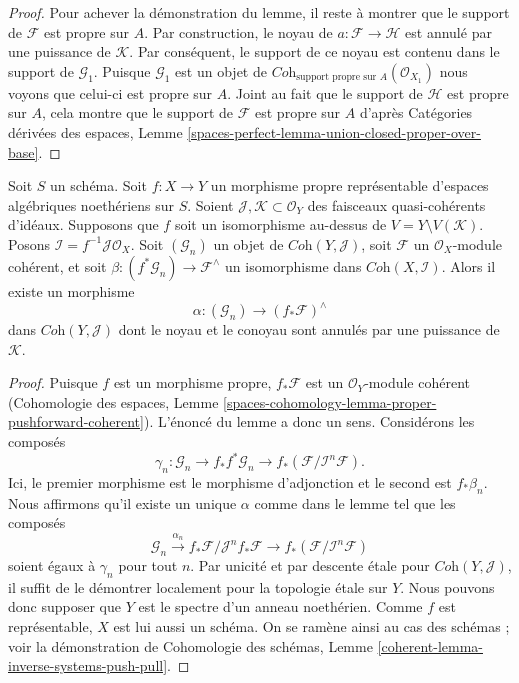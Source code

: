 \begin{proof}
\medskip\noindent
Pour achever la démonstration du lemme, il reste à montrer que le
support de $\mathcal{F}$ est propre sur $A$.
Par construction, le noyau de $a : \mathcal{F} \to \mathcal{H}$
est annulé par une puissance de $\mathcal{K}$. Par conséquent, le support de
ce noyau est contenu dans le support de $\mathcal{G}_1$. Puisque
$\mathcal{G}_1$ est un objet de
$\textit{Coh}_{\text{support propre sur } A}(\mathcal{O}_{X_1})$
nous voyons que celui-ci est propre sur $A$. Joint au fait que le
support de $\mathcal{H}$ est propre sur $A$, cela montre que le
support de $\mathcal{F}$ est propre sur $A$ d'après
Catégories dérivées des espaces, Lemme
\ref{spaces-perfect-lemma-union-closed-proper-over-base}.
\end{proof}

\begin{lemma}
\label{lemma-inverse-systems-push-pull}
Soit $S$ un schéma. Soit $f : X \to Y$ un morphisme propre
représentable d'espaces algébriques noethériens sur $S$. Soient
$\mathcal{J}, \mathcal{K} \subset \mathcal{O}_Y$
des faisceaux quasi-cohérents d'idéaux.
Supposons que $f$ soit un isomorphisme au-dessus de $V = Y \setminus V(\mathcal{K})$.
Posons $\mathcal{I} = f^{-1}\mathcal{J} \mathcal{O}_X$.
Soit $(\mathcal{G}_n)$ un objet de $\textit{Coh}(Y, \mathcal{J})$,
soit $\mathcal{F}$ un $\mathcal{O}_X$-module cohérent, et soit
$\beta : (f^*\mathcal{G}_n)  \to \mathcal{F}^\wedge$ un isomorphisme dans
$\textit{Coh}(X, \mathcal{I})$. Alors il existe un morphisme
$$
\alpha :
(\mathcal{G}_n)
\longrightarrow
(f_*\mathcal{F})^\wedge
$$
dans $\textit{Coh}(Y, \mathcal{J})$ dont le noyau et le conoyau
sont annulés par une puissance de $\mathcal{K}$.
\end{lemma}

\begin{proof}
Puisque $f$ est un morphisme propre, $f_*\mathcal{F}$ est un
$\mathcal{O}_Y$-module cohérent (Cohomologie des espaces, Lemme
\ref{spaces-cohomology-lemma-proper-pushforward-coherent}).
L'énoncé du lemme a donc un sens. Considérons les composés
$$
\gamma_n : \mathcal{G}_n \to
f_*f^*\mathcal{G}_n \to
f_*(\mathcal{F}/\mathcal{I}^n\mathcal{F}).
$$
Ici, le premier morphisme est le morphisme d'adjonction et le second est $f_*\beta_n$.
Nous affirmons qu'il existe un unique $\alpha$ comme dans le lemme
tel que les composés
$$
\mathcal{G}_n \xrightarrow{\alpha_n}
f_*\mathcal{F}/\mathcal{J}^nf_*\mathcal{F} \to
f_*(\mathcal{F}/\mathcal{I}^n\mathcal{F})
$$
soient égaux à $\gamma_n$ pour tout $n$. Par unicité et par descente étale
pour $\textit{Coh}(Y, \mathcal{J})$, il suffit de le démontrer
localement pour la topologie étale sur $Y$. Nous pouvons donc supposer que $Y$
est le spectre d'un anneau noethérien. Comme $f$ est représentable,
$X$ est lui aussi un schéma. On se ramène ainsi au cas des
schémas ; voir la démonstration de
Cohomologie des schémas, Lemme \ref{coherent-lemma-inverse-systems-push-pull}.
\end{proof}

